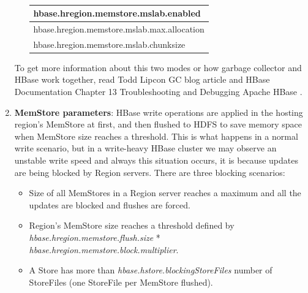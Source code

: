 \begin{enumerate}
\begin{enumerate}
\par
\begin{table}[htbp]
\caption{}
\begin{tabular}{|l|}
\hline
hbase.hregion.memstore.mslab.enabled  \\ \hline
hbase.hregion.memstore.mslab.max.allocation \\ \hline
hbase.hregion.memstore.mslab.chunksize \\ \hline
\end{tabular}
\label{HBase MSLAB parameters.}
\end{table}

\end{enumerate}


To get more information about this two modes or how garbage collector and HBase work together, read Todd Lipcon GC blog article \cite{MSLABexplained} and HBase Documentation Chapter 13 Troubleshooting and Debugging Apache HBase \cite{ApacheHBaseLogs}.

\item \textbf{MemStore parameters}:
\bigskip
HBase write operations are applied in the hosting region's MemStore at first, and then flushed to HDFS to save memory space when MemStore size reaches a threshold. This is what happens in a normal write scenario, but in a write-heavy HBase cluster we may observe an unstable write speed and always this situation occurs, it is because updates are being blocked by Region servers. There are three blocking scenarios:
\begin{itemize}
\item Size of all MemStores in a Region server reaches a maximum and all the updates are blocked and flushes are forced.
\item Region's MemStore size reaches a threshold defined by \textit{hbase.hregion.memstore.flush.size} * \textit{hbase.hregion.memstore.block.multiplier}.
\item A Store has more than \textit{hbase.hstore.blockingStoreFiles} number of StoreFiles (one StoreFile per MemStore flushed).
\end{itemize}


\end{enumerate}
